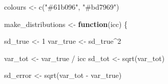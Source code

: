 \documentclass[
]{article}
\newenvironment{Shaded}{\begin{snugshade}}{\end{snugshade}}
\newcommand{\ControlFlowTok}[1]{\textcolor[rgb]{0.13,0.29,0.53}{\textbf{#1}}}
\newcommand{\DecValTok}[1]{\textcolor[rgb]{0.00,0.00,0.81}{#1}}
\newcommand{\FunctionTok}[1]{\textcolor[rgb]{0.00,0.00,0.00}{#1}}
\newcommand{\NormalTok}[1]{#1}
\newcommand{\OtherTok}[1]{\textcolor[rgb]{0.56,0.35,0.01}{#1}}
\newcommand{\SpecialCharTok}[1]{\textcolor[rgb]{0.00,0.00,0.00}{#1}}
\newcommand{\StringTok}[1]{\textcolor[rgb]{0.31,0.60,0.02}{#1}}
\begin{document}
\begin{Shaded}
\begin{Highlighting}[]
\NormalTok{colours }\OtherTok{\textless{}{-}} \FunctionTok{c}\NormalTok{(}\StringTok{"\#61b096"}\NormalTok{, }\StringTok{"\#bd7969"}\NormalTok{)}

\NormalTok{make\_distributions }\OtherTok{\textless{}{-}} \ControlFlowTok{function}\NormalTok{(icc) \{}
  
\NormalTok{  sd\_true }\OtherTok{\textless{}{-}} \DecValTok{1}
\NormalTok{  var\_true }\OtherTok{\textless{}{-}}\NormalTok{ sd\_true}\SpecialCharTok{\^{}}\DecValTok{2}
  
\NormalTok{  var\_tot }\OtherTok{\textless{}{-}}\NormalTok{ var\_true }\SpecialCharTok{/}\NormalTok{ icc}
\NormalTok{  sd\_tot }\OtherTok{\textless{}{-}} \FunctionTok{sqrt}\NormalTok{(var\_tot)}
  
\NormalTok{  sd\_error }\OtherTok{\textless{}{-}} \FunctionTok{sqrt}\NormalTok{(var\_tot }\SpecialCharTok{{-}}\NormalTok{ var\_true)}
  

\end{Highlighting}
\end{Shaded}
\end{document}
